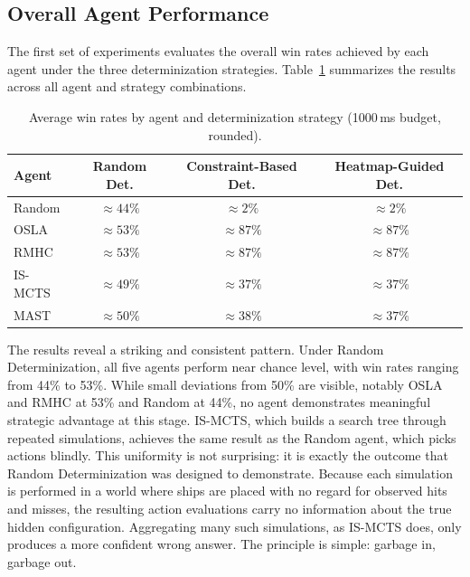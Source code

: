 \subsection{Overall Agent Performance}
\label{subsec:overall}

The first set of experiments evaluates the overall win rates achieved 
by each agent under the three determinization strategies. 
Table~\ref{tab:winrates} summarizes the results across all agent and 
strategy combinations.

\begin{table}[H]
\centering
\begin{tabular}{lccc}
\hline
\textbf{Agent} & \textbf{Random Det.} & \textbf{Constraint-Based Det.} 
               & \textbf{Heatmap-Guided Det.} \\
\hline
Random  & $\approx 44\%$ & $\approx 2\%$  & $\approx 2\%$  \\
OSLA    & $\approx 53\%$ & $\approx 87\%$ & $\approx 87\%$ \\
RMHC    & $\approx 53\%$ & $\approx 87\%$ & $\approx 87\%$ \\
IS-MCTS & $\approx 49\%$ & $\approx 37\%$ & $\approx 37\%$ \\
MAST    & $\approx 50\%$ & $\approx 38\%$ & $\approx 37\%$ \\
\hline
\end{tabular}
\captionsetup{justification=centering}
\caption{Average win rates by agent and determinization strategy 
         (1000\,ms budget, rounded).}
\label{tab:winrates}
\end{table}

The results reveal a striking and consistent pattern. Under Random 
Determinization, all five agents perform near chance level, with win 
rates ranging from 44\% to 53\%. While small deviations from 50\% are 
visible, notably OSLA and RMHC at 53\% and Random at 44\%, no 
agent demonstrates meaningful strategic advantage at this stage. 
IS-MCTS, which builds a search tree through repeated simulations, 
achieves the same result as the Random agent, which picks actions 
blindly. This uniformity is not surprising: it is exactly the outcome 
that Random Determinization was designed to demonstrate. Because each 
simulation is performed in a world where ships are placed with no 
regard for observed hits and misses, the resulting action evaluations 
carry no information about the true hidden configuration. Aggregating 
many such simulations, as IS-MCTS does, only produces a more confident 
wrong answer. The principle is simple: garbage in, garbage out.

